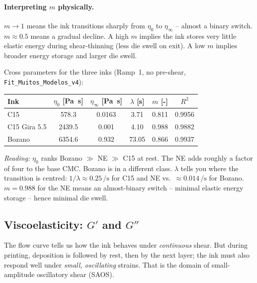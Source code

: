 \documentclass[11pt,a4paper]{article}
\begin{document}
\paragraph{Interpreting $m$ physically.}
$m\to 1$ means the ink transitions sharply from $\eta_0$ to $\eta_\infty$
-- almost a binary switch. $m\approx 0.5$ means a gradual decline.
A high $m$ implies the ink stores very little elastic energy during
shear-thinning (less die swell on exit). A low $m$ implies broader
energy storage and larger die swell.

\begin{examplebox}
Cross parameters for the three inks (Ramp~1, no pre-shear,
\texttt{Fit\_Muitos\_Modelos\_v4}):

\medskip\centering
\begin{tabular}{lccccc}
\toprule
Ink & $\eta_0$ [\si{\Pa\s}] & $\eta_\infty$ [\si{\Pa\s}] & $\lambda$ [\si{\s}] & $m$ [-] & $R^2$ \\
\midrule
C15           & 578.3   & 0.0163 & 3.71   & 0.811 & 0.9956 \\
C15 Gira 5.5  & 2439.5  & 0.001  & 4.10   & 0.988 & 0.9882 \\
Bozano        & 6354.6  & 0.932  & 73.05  & 0.866 & 0.9937 \\
\bottomrule
\end{tabular}

\medskip\flushleft
\emph{Reading:} $\eta_0$ ranks Bozano $\gg$ NE $\gg$ C15 at rest. The
NE adds roughly a factor of four to the base CMC. Bozano is in a
different class. $\lambda$ tells you where the transition is centred:
$1/\lambda\approx 0.25\,\si{\per\s}$ for C15 and NE vs.\ $\approx
0.014\,\si{\per\s}$ for Bozano. $m=0.988$ for the NE means an
almost-binary switch -- minimal elastic energy storage -- hence minimal
die swell.
\end{examplebox}

\subsection{Viscoelasticity: $G'$ and $G''$}
\label{sec:saos}

The flow curve tells us how the ink behaves under \emph{continuous}
shear. But during printing, deposition is followed by rest, then by the
next layer; the ink must also respond well under \emph{small, oscillating}
strains. That is the domain of small-amplitude oscillatory shear (SAOS).
\end{document}
